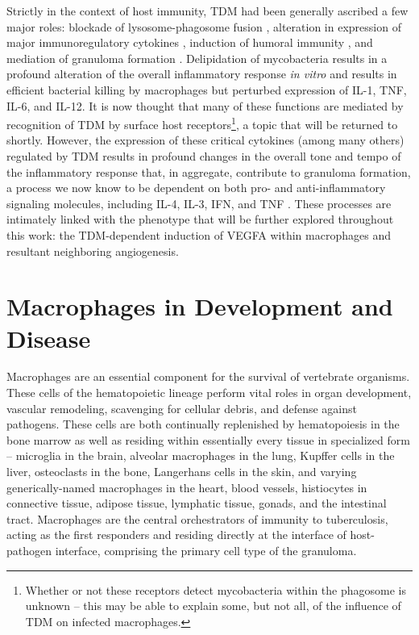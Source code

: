 Strictly in the context of host immunity, TDM had been generally ascribed a few major roles: blockade of lysosome-phagosome fusion \citep{Indrigo2003, Patin2017, Axelrod2008}, alteration in expression of major immunoregulatory cytokines \citep{Indrigo2002, Bowdish2004, Perez2000}, induction of humoral immunity \citep{Ryll2001, Fujiwara1999, Fujita2005}, and mediation of granuloma formation \citep{Bekierlunst1968, Hunter2006b, Lee2012}. Delipidation of mycobacteria results in a profound alteration of the overall inflammatory response \textit{in vitro} and results in efficient bacterial killing by macrophages but perturbed expression of IL-1\textbeta, TNF\textalpha, IL-6, and IL-12. It is now thought that many of these functions are mediated by recognition of TDM by surface host receptors\footnote{Whether or not these receptors detect mycobacteria within the phagosome is unknown -- this may be able to explain some, but not all, of the influence of TDM on infected macrophages.}, a topic that will be returned to shortly. However, the expression of these critical cytokines (among many others) regulated by TDM results in profound changes in the overall tone and tempo of the inflammatory response that, in aggregate, contribute to granuloma formation, a process we now know to be dependent on both pro- and anti-inflammatory signaling molecules, including IL-4, IL-3, IFN\textgamma, and TNF\textalpha{} \citep{Cronan2021, Cavalcanti2010, Flynn1993, Cooper1993, Kaneko1999, Bergeron1997}. These processes are intimately linked with the phenotype that will be further explored throughout this work: the TDM-dependent induction of VEGFA within macrophages and resultant neighboring angiogenesis.

\section{Macrophages in Development and Disease}\label{macrophages}

Macrophages are an essential component for the survival of vertebrate organisms. These cells of the hematopoietic lineage perform vital roles in organ development, vascular remodeling, scavenging for cellular debris, and defense against pathogens. These cells are both continually replenished by hematopoiesis in the bone marrow as well as residing within essentially every tissue in specialized form -- microglia in the brain, alveolar macrophages in the lung, Kupffer cells in the liver, osteoclasts in the bone, Langerhans cells in the skin, and varying generically-named macrophages in the heart, blood vessels, histiocytes in connective tissue, adipose tissue, lymphatic tissue, gonads, and the intestinal tract. Macrophages are the central orchestrators of immunity to tuberculosis, acting as the first responders and residing directly at the interface of host-pathogen interface, comprising the primary cell type of the granuloma. 


